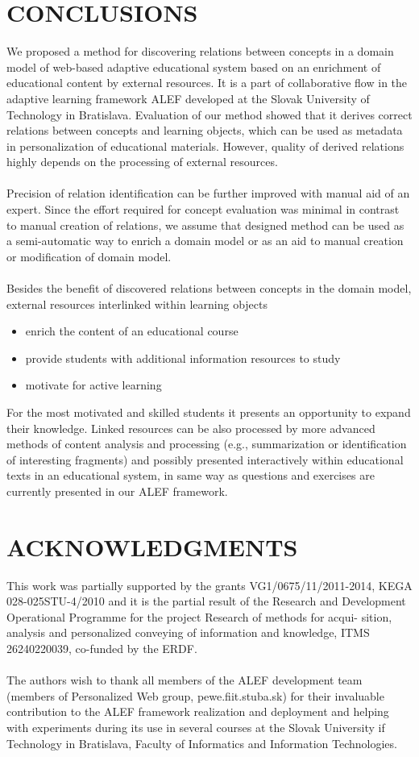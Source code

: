 \documentclass{llncs}
\begin{document}
\section{CONCLUSIONS}
%  
We proposed a method for discovering relations between concepts in a domain model of web-based adaptive educational system based on an enrichment of educational content by external resources. It is a part of collaborative flow in the adaptive learning framework ALEF developed at the Slovak University of Technology in Bratislava. Evaluation of our method showed that it derives correct relations between concepts and learning objects, which can be used as metadata in personalization of educational materials. However, quality of derived relations highly depends on the processing of external resources.\\
\\
Precision of relation identification can be further improved with manual aid of an expert. Since the effort required for concept evaluation was minimal in contrast to manual creation of relations, we assume that designed method can be used as a semi-automatic way to enrich a domain model or as an aid to manual creation or modification of domain model.\\
\\
Besides the benefit of discovered relations between concepts in the domain model, external resources interlinked within learning objects  
\begin{itemize}
\item enrich the content of an educational course
\item provide students with additional information resources to study 
\item motivate for active learning
\end{itemize} 
For the most motivated and skilled students it presents an opportunity to expand their knowledge. Linked resources can be also processed by more advanced methods of content analysis and processing (e.g., summarization or identification of interesting fragments) and possibly presented interactively within educational texts in an educational system, in same way as questions and exercises are currently presented in our ALEF framework.
\section{ACKNOWLEDGMENTS}
%  
This work was partially supported by the grants VG1/0675/11/2011-2014, KEGA 028-025STU-4/2010 and it is the partial result of the Research and Development Operational Programme for the project Research of methods for acqui- sition, analysis and personalized conveying of information and knowledge, ITMS 26240220039, co-funded by the ERDF.\\
\\
The authors wish to thank all members of the ALEF development team (members of Personalized Web group, pewe.fiit.stuba.sk) for their invaluable contribution to the ALEF framework realization and deployment and helping with experiments during its use in several courses at the Slovak University if Technology in Bratislava, Faculty of Informatics and Information Technologies. 
\end{document}
